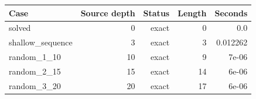 {\small
\begin{tabular}{lrrrr}
\hline
Case & Source depth & Status & Length & Seconds \\
\hline
solved & 0 & exact & 0 & 0.0 \\
shallow\_sequence & 3 & exact & 3 & 0.012262 \\
random\_1\_10 & 10 & exact & 9 & 7e-06 \\
random\_2\_15 & 15 & exact & 14 & 6e-06 \\
random\_3\_20 & 20 & exact & 17 & 6e-06 \\
\hline
\end{tabular}
}
